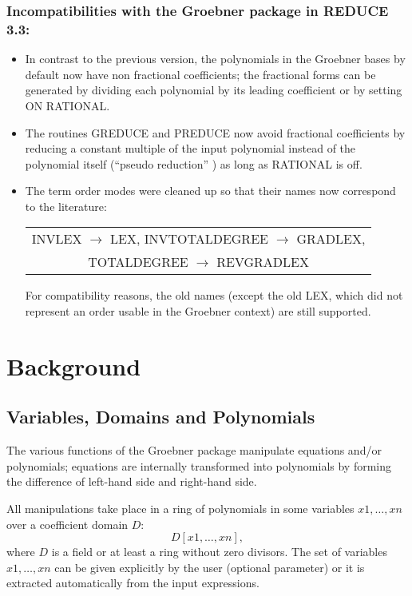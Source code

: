 \subsubsection*{Incompatibilities with the Groebner package in
REDUCE 3.3:}
\begin{itemize}
\item In contrast to the previous version, the polynomials in the
Groebner bases by default now have non fractional coefficients;
the fractional forms can be generated by dividing each polynomial
by its leading coefficient or by setting ON RATIONAL.

 
\item The routines GREDUCE and PREDUCE now avoid fractional coefficients
by reducing a constant multiple of the input polynomial instead of the
polynomial itself (``pseudo reduction'' ) as long as RATIONAL is off.

\item The term order modes were cleaned up so that their names
now correspond to the literature:
\begin{center}
\begin{tabular}{c}
INVLEX $\rightarrow$ LEX, INVTOTALDEGREE $\rightarrow$
GRADLEX, \\
TOTALDEGREE $\rightarrow$ REVGRADLEX
\end{tabular}
\end{center}
 For compatibility reasons, the old names (except the old LEX, which
 did not represent an order usable in the Groebner context) are
 still supported.
\end{itemize}

\section{Background}

\subsection{Variables, Domains and Polynomials}

The various functions of the Groebner package manipulate
equations and/or polynomials; equations are internally
transformed into  polynomials by forming the difference of
left-hand side and right-hand side.

All manipulations take place in a ring of polynomials in some
variables $x1, \ldots , xn$ over a coefficient domain $D$:
\[
D [x1,\ldots , xn],
\]
where $D$ is a field or at least a ring without zero divisors.
The set of variables $x1,\ldots ,xn$ can be given explicitly by the
user (optional parameter) or it is extracted automatically from the
input expressions.

